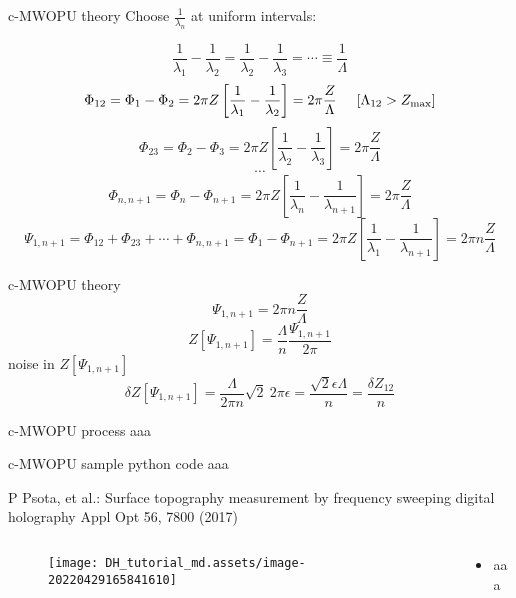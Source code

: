 \documentclass[t, aspectratio=169]{beamer}
\begin{document}
\begin{frame}{c-MWOPU theory}
Choose $\displaystyle\frac{1}{\lambda_n}$ at uniform intervals:
	\begin{small}
\[ \frac{1}{\lambda_1}-\frac{1}{\lambda_2} = \frac{1}{\lambda_2}-\frac{1}{\lambda_3} = \cdots \equiv \frac{1}{\Lambda} \]
\[ \Phi_{12} = \Phi_1-\Phi_2 = 2\pi Z\left[ \frac{1}{\lambda_1}-\frac{1}{\lambda_2} \right] = 2\pi\frac{Z}{\Lambda} \hspace{5 mm} [\Lambda_{12}>Z_{\max}] \]
\[ \Phi_{23} = \Phi_2-\Phi_3 = 2\pi Z\left[ \frac{1}{\lambda_2}-\frac{1}{\lambda_3} \right] = 2\pi\frac{Z}{\Lambda} \]
\[ \cdots \]
\[ \Phi_{n,n+1} = \Phi_n-\Phi_{n+1} = 2\pi Z\left[ \frac{1}{\lambda_n}-\frac{1}{\lambda_{n+1}} \right] = 2\pi\frac{Z}{\Lambda} \]
\[ \Psi_{1,n+1} = \Phi_{12}+\Phi_{23}+\cdots+\Phi_{n,n+1} = \Phi_1-\Phi_{n+1} = 2\pi Z\left[\frac{1}{\lambda_1}-\frac{1}{\lambda_{n+1}}\right] = 2\pi n\frac{Z}{\Lambda} \]
	\end{small}
\end{frame}


\begin{frame}{c-MWOPU theory}
\[ \Psi_{1,n+1} = 2\pi n\frac{Z}{\Lambda} \]
\[ Z[\Psi_{1,n+1}] = \frac{\Lambda}{n}\frac{\Psi_{1,n+1}}{2\pi} \]
noise in $Z[\Psi_{1,n+1}]$
\[ \delta Z[\Psi_{1,n+1}] = \frac{\Lambda}{2\pi n}\sqrt{2}\ 2\pi\epsilon = \frac{\sqrt{2}\epsilon\Lambda}{n} = \frac{\delta Z_{12}}{n} \]
\end{frame}


\begin{frame}{c-MWOPU process}
aaa
\end{frame}


\begin{frame}{c-MWOPU sample python code}
aaa
\end{frame}


\begin{frame}{P Psota, et al.: Surface topography measurement by frequency sweeping digital holography}
	\vspace{-3 mm}
	\small Appl Opt 56, 7800 (2017)
	\begin{columns}
		\begin{column}{.6\textwidth}
			\begin{figure}
				\texttt{[image: DH\_tutorial\_md.assets/image-20220429165841610]}
			\end{figure}
		\end{column}
		\begin{column}{.4\textwidth}
			\begin{itemize}
				\item aaa
			\end{itemize}
		\end{column}
	\end{columns}
\end{frame}
\end{document}
